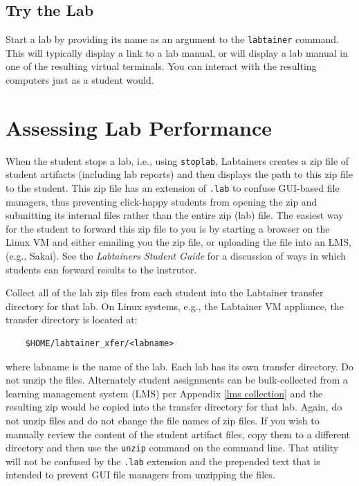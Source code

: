 \documentclass[12pt]{article}
\begin{document}
\subsection{Try the Lab}
Start a lab by providing its name as an argument to the {\tt labtainer} command.
This will typically display a link to a lab manual, or will display a lab manual in one of
the resulting virtual terminals.  You can interact with the resulting computers just as a
student would.

\section{Assessing Lab Performance}
When the student stops a lab, i.e., using {\tt stoplab}, Labtainers creates a zip file of
student artifacts (including lab reports) and then displays the path to this zip file to
the student.  This zip file has an extension of {\tt .lab} to confuse GUI-based file managers,
thus preventing click-happy students from opening the zip and submitting its internal files rather than the entire
zip (lab) file.  The easiest way for the student to forward this zip file to you is by starting
a browser on the Linux VM and either emailing you the zip file, or uploading the file
into an LMS, (e.g., Sakai).  See the \textit{Labtainers Student Guide} for a discussion of
ways in which students can forward results to the instrutor.

Collect all of the lab zip files from each student into the Labtainer transfer directory for
that lab.  On
Linux systems, e.g., the Labtainer VM appliance, the transfer directory is located at:

\begin{verbatim}
    $HOME/labtainer_xfer/<labname>
\end{verbatim}
\noindent where labname is the name of the lab.  Each lab has its own transfer directory.
Do not unzip the files.  Alternately student
assignments can be bulk-collected from a learning management system (LMS) per Appendix \ref{lms collection}
and the resulting zip  would be copied into the
transfer directory for that lab.  Again, do not unzip files and do not change the file names of zip files.
If you wish to manually review the content of the student artifact files, copy them to a different directory and
then use the {\tt unzip} command on the command line.  That utility will not be confused by the {\tt .lab} extension
and the prepended text that is intended to prevent GUI file managers from unzipping the files.
\end{document}

